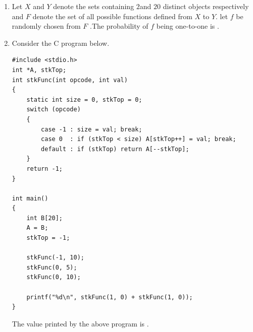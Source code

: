 \documentclass[journal,12pt,onecolumn]{IEEEtran}
\theoremstyle{remark}
\begin{document}
\begin{enumerate}
\begin{verbatim}
if |fb| >= e then
write "Non-convergence"     // loop terminated with i = N
else
write "return xb"
End if
		\end{verbatim}
		
		\hfill{}
		
		\begin{enumerate}
		\end{enumerate}
		
		\item Let $X$ and $Y$ denote the sets containing $2$and $20$ distinct objects respectively and $F$ denote the set of all possible functions defined from $X$ to $Y$. let $f$ be randomly chosen from $F$ .The probability of $f$ being one-to-one is \underline{\hspace{2cm}}.
		
		\hfill{}
		
		\item Consider the C program below.
		\begin{verbatim}
#include <stdio.h>
int *A, stkTop;
int stkFunc(int opcode, int val)
{
	static int size = 0, stkTop = 0;
	switch (opcode)
	{
		case -1 : size = val; break;
		case 0  : if (stkTop < size) A[stkTop++] = val; break;
		default : if (stkTop) return A[--stkTop];
	}
	return -1;
}

int main()
{
	int B[20];
	A = B;
	stkTop = -1;
	
	stkFunc(-1, 10);
	stkFunc(0, 5);
	stkFunc(0, 10);
	
	printf("%d\n", stkFunc(1, 0) + stkFunc(1, 0));
}
				\end{verbatim}	
		The value printed by the above program is \underline{\hspace{2cm}}.
		
		\hfill{}
		
	\end{enumerate}
	
\end{document}
